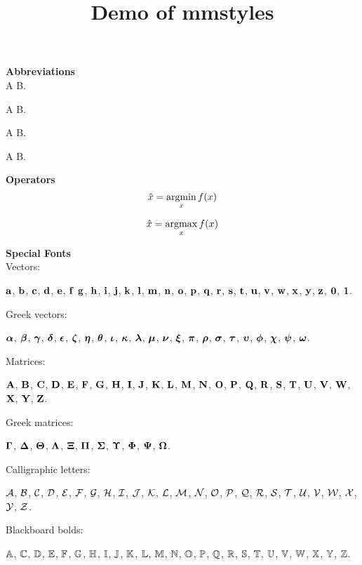 \documentclass[a4paper,11pt]{article}
\title{\bf Demo of mmstyles}
\author{}
\date{}
\begin{document}
	
\maketitle	

\noindent\textbf{Abbreviations} \\

A \ie B.

A \eg B.

A \wrt B.

A \etal B.

\vspace{20pt}


\noindent \textbf{Operators} \\

\[
\hat{x} = \argmin_x f(x)
\]

\[
\hat{x} = \argmax_x f(x)
\]


\vspace{20pt}

\noindent \textbf{Special Fonts} \\

Vectors:

$\va$, $\vb$, $\vc$, $\vd$, $\ve$, $\vf$
$\vg$, $\vh$, $\vi$, $\vj$, $\vk$, $\vl$,
$\vm$, $\vn$, $\vo$, $\vp$, $\vq$, $\vr$,
$\vs$, $\vt$, $\vu$, $\vv$, $\vw$, $\vx$, 
$\vy$, $\vz$, $\vzero$, $\vone$.

Greek vectors:

$\valpha$, $\vbeta$, $\vgamma$, $\vdelta$,
$\vepsilon$, $\vzeta$, $\veta$, $\vtheta$,
$\viota$, $\vkappa$, $\vlambda$, 
$\vmu$, $\vnu$, $\vxi$, $\vpi$,
$\vrho$, $\vsigma$, $\vtau$, $\vupsilon$,
$\vphi$, $\vchi$, $\vpsi$, $\vomega$.

Matrices:

$\mA$, $\mB$, $\mC$, $\mD$, $\mE$, $\mF$,
$\mG$, $\mH$, $\mI$, $\mJ$, $\mK$, $\mL$,
$\mM$, $\mN$, $\mO$, $\mP$, $\mQ$, $\mR$,
$\mS$, $\mT$, $\mU$, $\mV$, $\mW$, $\mX$,
$\mY$, $\mZ$.

Greek matrices:

$\mGamma$, $\mDelta$, $\mTheta$, $\mLambda$,
$\mXi$, $\mPi$, $\mSigma$, $\mUpsilon$,
$\mPhi$, $\mPsi$, $\mOmega$.

Calligraphic letters:

$\cA$, $\cB$, $\cC$, $\cD$, $\cE$, $\cF$,
$\cG$, $\cH$, $\cI$, $\cJ$, $\cK$, $\cL$,
$\cM$, $\cN$, $\cO$, $\cP$, $\cQ$, $\cR$,
$\cS$, $\cT$, $\cU$, $\cV$, $\cW$, $\cX$,
$\cY$, $\cZ$.

Blackboard bolds:

$\Abb$, $\Cbb$, $\Dbb$, $\Ebb$, $\Fbb$, 
$\Gbb$, $\Hbb$, $\Ibb$, $\Jbb$, $\Kbb$, $\Lbb$, 
$\Mbb$, $\Nbb$, $\Obb$, $\Pbb$, $\Qbb$, $\Rbb$,
$\Sbb$, $\Tbb$, $\Ubb$, $\Vbb$, $\Wbb$, $\Xbb$,
$\Ybb$, $\Zbb$.


	
\end{document}
